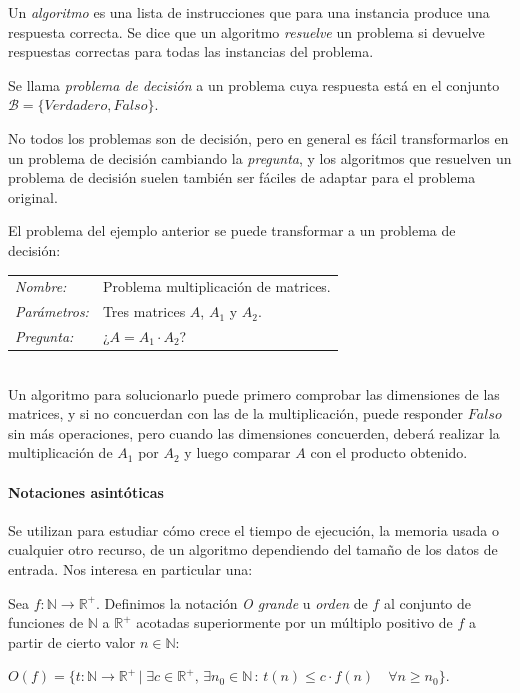 \begin{definition}	
	Un \textit{algoritmo} es una lista de instrucciones que para una instancia produce una respuesta correcta. Se dice que un algoritmo \textit{resuelve} un problema si devuelve respuestas correctas para todas las instancias del problema.
\end{definition}


\begin{definition}
	Se llama \textit{problema de decisión} a un problema cuya respuesta está en el conjunto $\mathcal{B}= \{Verdadero, Falso\}$.
\end{definition}


No todos los problemas son de decisión, pero en general es fácil transformarlos en un problema de decisión cambiando la \textit{pregunta}, y los algoritmos que resuelven un problema de decisión suelen también ser fáciles de adaptar para el problema original.

\begin{example}
	El problema del ejemplo anterior se puede transformar a un problema de decisión:
	
	\begin{tabular}{|ll}
		\textit{Nombre:} & Problema multiplicación de matrices. \\
		\textit{Parámetros:} & Tres matrices $A$, $A_1$ y $A_2$. \\
		\textit{Pregunta:} & ¿$ A = A_1 \cdot A_2$? \\
	\end{tabular}
	\\
	
	Un algoritmo para solucionarlo puede primero comprobar las dimensiones de las matrices, y si no concuerdan con las de la multiplicación, puede responder $Falso$ sin más operaciones, pero cuando las dimensiones concuerden, deberá realizar la multiplicación de $A_1$ por $A_2$ y luego comparar $A$ con el producto obtenido.
	
\end{example}

\hfil

\paragraph{Notaciones asintóticas} Se utilizan para estudiar cómo crece el tiempo de ejecución, la memoria usada o cualquier otro recurso, de un algoritmo dependiendo del tamaño de los datos de entrada. Nos interesa en particular una:

\begin{definition}
	Sea $f : \mathbb{N} \rightarrow \mathbb{R}^+$. Definimos la notación \textit{O grande} u \textit{orden} de $f$ al conjunto de funciones de $\mathbb{N}$ a $\mathbb{R}^+$ acotadas superiormente por un múltiplo positivo de $f$ a partir de cierto valor $n \in \mathbb{N}$:
		
		$O(f) = \{t:\mathbb{N} \rightarrow \mathbb{R}^+ \, | \; \exists c \in \mathbb{R}^+,\, \exists 
		n_0\in \mathbb{N} \, : \, t(n) \leq c\cdot f(n) \quad \forall n \geq n_0  \}$. 

\end{definition}

